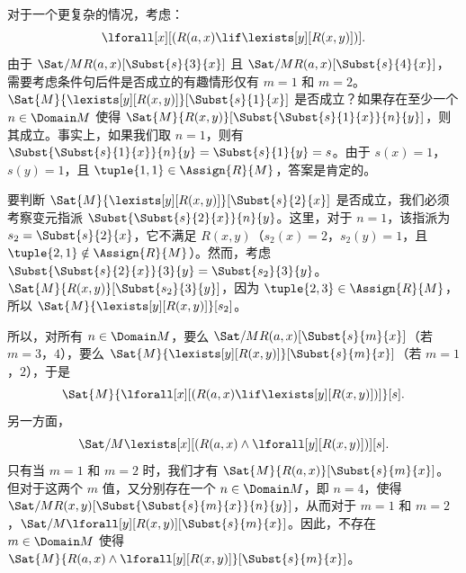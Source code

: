 \documentclass[../../../include/open-logic-section]{subfiles}
\begin{document}
\begin{ex}

对于一个更复杂的情况，考虑：
\[
\lforall[x][(R(a,x) \lif \lexists[y][R(x,y)])].
\]
由于 $\Sat/{M}{R(a,x)}[\Subst{s}{3}{x}]$ 且 $\Sat/{M}{R(a,x)}[\Subst{s}{4}{x}]$，需要考虑条件句后件是否成立的有趣情形仅有 $m = 1$ 和 $m = 2$。$\Sat{M}{\lexists[y][R(x,y)]}[\Subst{s}{1}{x}]$ 是否成立？如果存在至少一个 $n \in \Domain M$ 使得 $\Sat{M}{R(x,y)}[\Subst{\Subst{s}{1}{x}}{n}{y}]$，则其成立。事实上，如果我们取 $n = 1$，则有 $\Subst{\Subst{s}{1}{x}}{n}{y} = \Subst{s}{1}{y} =
s$。由于 $s(x) = 1$，$s(y) = 1$，且 $\tuple{1,1} \in \Assign{R}{M}$，答案是肯定的。

要判断 $\Sat{M}{\lexists[y][R(x,y)]}[\Subst{s}{2}{x}]$ 是否成立，我们必须考察变元指派 $\Subst{\Subst{s}{2}{x}}{n}{y}$。这里，对于 $n = 1$，该指派为~$s_2 = \Subst{s}{2}{x}$，它不满足 $R(x,y)$（$s_2(x) = 2$，$s_2(y) = 1$，且 $\tuple{2,1}\notin \Assign{R}{M}$）。然而，考虑 $\Subst{\Subst{s}{2}{x}}{3}{y} = \Subst{s_2}{3}{y}$。
$\Sat{M}{R(x,y)}[\Subst{s_2}{3}{y}]$，因为 $\tuple{2,3} \in
\Assign{R}{M}$，所以 $\Sat{M}{\lexists[y][R(x,y)]}[s_2]$。

所以，对所有 $n \in \Domain M$，要么 $\Sat/{M}{R(a,x)}[\Subst{s}{m}{x}]$（若 $m = 3$，$4$），要么 $\Sat{M}{\lexists[y][R(x,y)]}[\Subst{s}{m}{x}]$（若 $m = 1$，$2$），于是
\[
\Sat{M}{\lforall[x][(R(a,x) \lif \lexists[y][R(x,y)])]}[s].
\]
另一方面，
\[
\Sat/{M}{\lexists[x][(R(a,x) \land \lforall[y][R(x,y)])]}[s].
\]
只有当 $m = 1$ 和 $m = 2$ 时，我们才有 $\Sat{M}{R(a,x)}[\Subst{s}{m}{x}]$。但对于这两个 $m$ 值，又分别存在一个 $n \in \Domain M$，即 $n = 4$，使得 $\Sat/{M}{R(x,y)}[\Subst{\Subst{s}{m}{x}}{n}{y}]$，从而对于 $m = 1$ 和 $m = 2$，$\Sat/{M}{\lforall[y][R(x,y)]}[\Subst{s}{m}{x}]$。因此，不存在 $m \in \Domain M$ 使得 $\Sat{M}{R(a,x)
\land \lforall[y][R(x,y)]}[\Subst{s}{m}{x}]$。
\end{ex}
\end{document}
